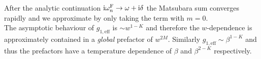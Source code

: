 \documentclass[english, parskip=full]{scrartcl}
\begin{document}
After the analytic continuation $\text{i}\omega_n^{\text{F}}\rightarrow \omega + \text{i}\delta$ the Matsubara sum converges rapidly and we approximate by only taking the term with $m=0$.\\
The asymptotic behaviour of $g_{1,\text{eff}}$ is $\sim w^{1-K}$ and therefore the $w$-dependence is approximately contained in a \emph{global} prefactor of $w^{2M}$.
Similarly $g_{1,\text{eff}} \sim \beta^{1-K}$ and thus the prefactors have a temperature dependence of $\beta$ and $\beta^{2-K}$ respectively.
\end{document}
